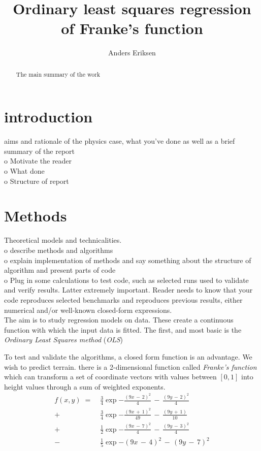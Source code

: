 \documentclass[ 12pt, a4paper ]{article}
\title{Ordinary least squares regression of Franke's function}
\author{Anders Eriksen}
\date{}
\begin{document}
\maketitle
\tableofcontents
\listoffigures
\listoftables
\begin{abstract}
    The main summary of the work
\end{abstract}

\section{introduction}
    aims and rationale of the physics case, what you've done as well as a brief summary of 
the report \\
    o   Motivate the reader\\
    o   What done\\
    o   Structure of report\\
\section{Methods}
    Theoretical models and technicalities. \\
    o   describe methods and algorithms\\
    o   explain implementation of methods and say something about the structure of
        algorithm and present parts of code\\
    o   Plug in some calculations to test code, such as selected runs used to validate and
        verify results. Latter extremely important. Reader needs to know that your code
        reproduces selected benchmarks and reproduces previous results, either numerical 
        and/or well-known closed-form expressions. \\

The aim is to study regression models on data. These create a continuous function with which
the input data is fitted. The first, and most basic is the \textit{Ordinary Least Squares method} 
(\textit{OLS})

To test and validate the algorithms, a closed form function is an advantage. We wish to predict
terrain. there is a 2-dimensional function called \textit{Franke's function}\cite{} which can 
transform a set of coordinate vectors with values between $[0, 1]$ into height values through 
a sum of weighted exponents. 
\begin{align}
    f(x, y) \;=\; 
        &\frac{3}{4} \exp{ - \frac{(9x \,-\, 2)^2}{4}    \,-\, \frac{(9y \,-\, 2)^2}{4} }
    \nonumber \\
    +   &\frac{3}{4} \exp{ - \frac{(9x \,+\, 1)^2}{49}   \,-\, \frac{(9y \,+\, 1)  }{10} }
    \nonumber \\
    +   &\frac{1}{2} \exp{ - \frac{(9x \,-\, 7)^2}{4}    \,-\, \frac{(9y \,-\, 3)^2}{4} }
    \nonumber \\
    -   &\frac{1}{5} \exp{ -       (9x \,-\, 4)^2        \,-\,       (9y \,-\, 7)^2     }
    \label{eq:franke}
\end{align}
\end{document}
